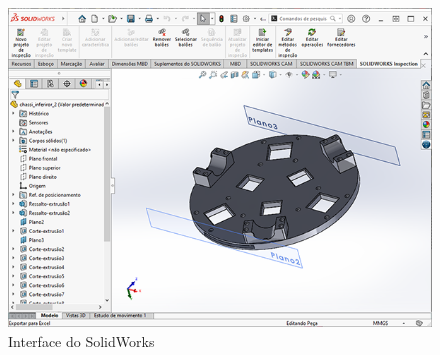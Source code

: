 \begin{figure}[h]
	\centering
	\includegraphics[width=1\textwidth]{figures/soliworks}
	\caption{Interface do SolidWorks}
	\label{fig:interface_soliwoks}
\end{figure}